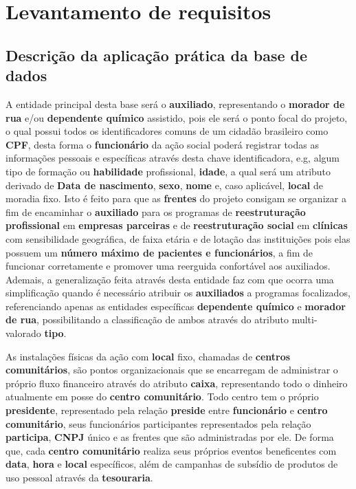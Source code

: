 \section{Levantamento de requisitos}

\subsection{Descrição da aplicação prática da base de dados}
A entidade principal desta base será o \textbf{auxiliado}, representando o \textbf{morador de rua} e/ou \textbf{dependente químico} assistido, pois ele será o ponto focal do projeto, o qual possui todos os identificadores comuns de um cidadão brasileiro como \textbf{CPF}, desta forma o \textbf{funcionário} da ação social poderá registrar todas as informações pessoais e específicas através desta chave identificadora, e.g, algum tipo de formação ou \textbf{habilidade} profissional, \textbf{idade}, a qual será um atributo derivado de \textbf{Data de nascimento}, \textbf{sexo}, \textbf{nome} e, caso aplicável, \textbf{local} de moradia fixo. Isto é feito para que as \textbf{frentes} do projeto consigam se organizar a fim de encaminhar o \textbf{auxiliado} para os programas de \textbf{reestruturação profissional} em \textbf{empresas parceiras} e de \textbf{reestruturação social} em \textbf{clínicas} com sensibilidade geográfica, de faixa etária e de lotação das instituições pois elas possuem um \textbf{número máximo de pacientes e funcionários}, a fim de funcionar corretamente e promover uma reerguida confortável aos auxiliados. Ademais, a generalização feita através desta entidade faz com que ocorra uma simplificação quando é necessário atribuir os \textbf{auxiliados} a programas focalizados, referenciando apenas as entidades específicas \textbf{dependente químico} e \textbf{morador de rua}, possibilitando a classificação de ambos através do atributo multi-valorado \textbf{tipo}.

As instalações físicas da ação com \textbf{local} fixo, chamadas de \textbf{centros comunitários}, são pontos organizacionais que se encarregam de administrar o próprio fluxo financeiro através do atributo \textbf{caixa}, representando todo o dinheiro atualmente em posse do \textbf{centro comunitário}. Todo centro tem o próprio \textbf{presidente}, representado pela relação \textbf{preside} entre \textbf{funcionário} e \textbf{centro comunitário}, seus funcionários participantes representados pela relação \textbf{participa}, \textbf{CNPJ} único e as frentes que são administradas por ele. De forma que, cada \textbf{centro comunitário} realiza seus próprios eventos beneficentes com \textbf{data}, \textbf{hora} e \textbf{local} específicos, além de campanhas de subsídio de produtos de uso pessoal através da \textbf{tesouraria}. 

